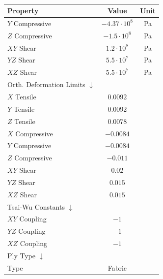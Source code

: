 \documentclass{amsdtx}
\begin{document}
\begin{table}[H]
\begin{tabular}{l|c|c}
\end{tabular}~~~~~~
\begin{tabular}{l|c|c}
\bf Property & \bf Value & \bf Unit \\\hline\hline
\quad $Y$ Compressive & $-4.37\cdot 10^8$ & Pa\\\hline
\quad $Z$ Compressive & $-1.5\cdot 10^8$ & Pa\\\hline
\quad $XY$ Shear & $1.2\cdot 10^8$ & Pa\\\hline
\quad $YZ$ Shear & $5.5\cdot 10^7$ & Pa\\\hline
\quad $XZ$ Shear & $5.5\cdot 10^7$ & Pa\\\hline
Orth. Deformation Limits	$\downarrow$ & & \\\hline
\quad $X$ Tensile & $0.0092$ & \\\hline
\quad $Y$ Tensile & $0.0092$ & \\\hline
\quad $Z$ Tensile & $0.0078$ & \\\hline
\quad $X$ Compressive & $-0.0084$ & \\\hline
\quad $Y$ Compressive & $-0.0084$ & \\\hline
\quad $Z$ Compressive & $-0.011$ & \\\hline
\quad $XY$ Shear & $0.02$ & \\\hline
\quad $YZ$ Shear & $0.015$ & \\\hline
\quad $XZ$ Shear & $0.015$ & \\\hline
Tsai-Wu Constants $\downarrow$ & & \\\hline
\quad $XY$ Coupling & $-1$ & \\\hline
\quad $YZ$ Coupling & $-1$ & \\\hline
\quad $XZ$ Coupling & $-1$ & \\\hline
Ply Type $\downarrow$ & & \\\hline
\quad Type & Fabric\\\hline
\end{tabular}
\end{table}
~\\[-2em]
\end{document}

